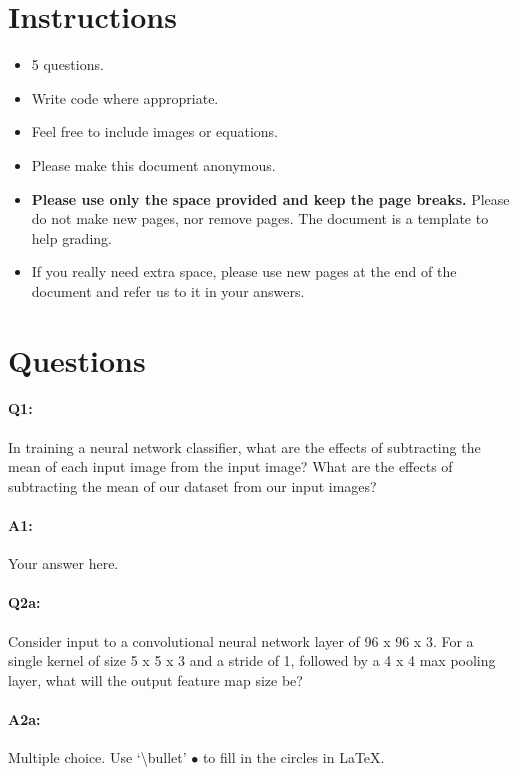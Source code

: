 \section*{Instructions}
\begin{itemize}
  \item 5 questions.
  \item Write code where appropriate.
  \item Feel free to include images or equations.
  \item Please make this document anonymous.
  \item \textbf{Please use only the space provided and keep the page breaks.} Please do not make new pages, nor remove pages. The document is a template to help grading.
  \item If you really need extra space, please use new pages at the end of the document and refer us to it in your answers.
\end{itemize}

\section*{Questions}

\paragraph{Q1:} In training a neural network classifier, what are the effects of subtracting the mean of each input image from the input image? What are the effects of subtracting the mean of our dataset from our input images? 

\paragraph{A1:} Your answer here.



\pagebreak
\paragraph{Q2a:} Consider input to a convolutional neural network layer of 96 x 96 x 3. For a single kernel of size 5 x 5 x 3 and a stride of 1, followed by a 4 x 4 max pooling layer, what will the output feature map size be?

\paragraph{A2a:} Multiple choice. Use `\textbackslash{}bullet' $\bullet$ to fill in the circles in \LaTeX.

